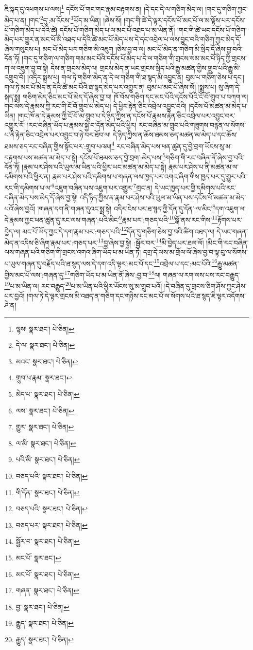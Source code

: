 ཇི་སྐད་དུ་འཕགས་པ་ལས།\footnote{ལྷས།  སྣར་ཐང་།  པེ་ཅིན། } དངོས་པོ་གང་གང་རྣམ་བརྟགས་ན། །དེ་དང་དེ་ལ་གཅིག་མེད་ལ། །གང་དུ་གཅིག་ཀྱང་མེད་པ་ན། །གང་\footnote{དེ་ལ་  སྣར་ཐང་།  པེ་ཅིན། }དུ་:མ་འོངས་\footnote{མའང་  སྣར་ཐང་།  པེ་ཅིན། }ཡོད་མ་ཡིན། །ཞེས་སོ། །གང་གི་ཚེ་དེ་ལྟར་དངོས་པོ་མང་པོ་ལ་མ་ལྟོས་པར་དངོས་པོ་གཅིག་མེད་པ་དེའི་ཚེ། དངོས་པོ་གཅིག་མེད་པ་ལ་མང་པོ་འཐད་པ་མ་ཡིན་ནོ། །གང་གི་ཚེ་ཡང་དངོས་པོ་གཅིག་མེད་པར་གྱུར་ན་མང་པོ་མི་འཐད་པ་དེའི་ཚེ་མང་པོ་མེད་པས་དེ་དང་འབྲེལ་པ་ལས་བྱུང་བའི་གཅིག་ཀྱང་མེད་དོ་ཞེས་གསུངས་པ། མང་པོ་མེད་པར་གཅིག་མི་འཇུག །ཅེས་བྱ་བ་ལ། མང་པོ་མེད་ན་གཅིག་མི་སྲིད་དོ་ཞེས་བྱ་བའི་དོན་ཏོ། །གང་དུ་གཅིག་ལ་གཅིག་གམ་མང་པོའི་དངོས་པོ་མེད་པ་དེ་ལ་གཅིག་གི་གྲངས་སམ་མང་པོ་ཉིད་ཀྱི་གྲངས་ག་ལ་འཇུག་བྱ་བ་སྟེ། དེས་ན་གྲངས་མེད་ལ། གྲངས་མེད་ན་ཡང་གྲངས་སྲིད་པའི་རྒྱུ་མཚན་གྱིས་གྲུབ་པའི་རྒྱུ་མི་འགྲུབ་བོ། །འདིར་སྨྲས་པ། གལ་ཏེ་གཅིག་མེད་ན་དེ་ལ་གཅིག་གི་ཐ་སྙད་མི་འབྱུང་ན། བུམ་པ་གཅིག་ཅེས་པ་དང་། གལ་ཏེ་མང་པོ་མེད་ན་དེའི་ཚེ་མང་པོའི་ཐ་སྙད་མེད་པར་འགྱུར་ན། བུམ་པ་མང་པོ་ཞེས་སོ། །སྨྲས་པ། སུ་ཞིག་དེ་སྐད་སྨྲ། གཅིག་མེད་ཅིང་མང་པོ་མེད་དོ་ཞེས་བྱ་བ། ཁོ་བོས་གཅིག་དང་མང་པོའི་དངོས་པོའི་ངོ་བོ་གྲུབ་པ་བཀག་ལ། གང་ལས་དེ་རྣམས་ཀྱི་རང་གི་ངོ་བོ་གྲུབ་པ་མེད་པ། དེ་ཕྱིར་རྟེན་ཅིང་འབྲེལ་འབྱུང་བའི། །དངོས་པོ་མཚན་མ་མེད་པ་ཡིན། །གང་ཁོ་ན་དེ་རྣམས་ཀྱི་ངོ་བོ་མ་གྲུབ་པ་དེ་ཉིད་ཀྱིས་ན་དངོས་པོ་རྣམས་རྟེན་ཅིང་འབྲེལ་པར་འབྱུང་བར་འགྱུར་རོ། །རང་བཞིན་ཡོད་པ་རྣམས་སྐྱེ་བ་དོན་མེད་པའི་ཕྱིར། རང་བཞིན་མ་གྲུབ་པའི་གཟུགས་བརྙན་ལ་སོགས་པ་ནི་རྟེན་ཅིང་འབྲེལ་པར་འབྱུང་བ་ཉེ་བར་ཐོབ་ལ། དེ་ཉིད་ཀྱིས་ན་ཆོས་ཐམས་ཅད་མཚན་མ་མེད་པ་དང་ཆོས་ཐམས་ཅད་རང་བཞིན་གྱིས་སྟོང་པར་:གྲུབ་པའམ།\footnote{གྲུབ་པ་རྣམ།  སྣར་ཐང་། } རང་བཞིན་མེད་པས་ཕན་ཚུན་དུ་བྱེ་བྲག་ཡོངས་སུ་མ་བརྟགས་པས་མཚན་མ་མེད་པ་སྟེ། དངོས་པོ་ཐམས་ཅད་བྱེ་བྲག་:མེད་པས་\footnote{མེད་པ་  སྣར་ཐང་།  པེ་ཅིན། }གཅིག་གི་རང་བཞིན་ནོ་ཞེས་བྱ་བའི་དོན་ཏོ། །རྣམ་པར་ཤེས་པའི་ཡུལ་མ་ཡིན་པའི་ཕྱིར་ཡང་མཚན་མ་མེད་པ་སྟེ། རྣམ་པར་ཤེས་པ་ནི་མཚན་མ་ལ་དམིགས་པའི་ཕྱིར་ན། རྣམ་པར་ཤེས་པའི་དམིགས་པ་གཞན་ལས་ཁྱད་པར་འགའ་ཞིག་གིས་ཁྱད་པར་དུ་གྱུར་པའི་རང་གི་དམིགས་པ་ལ་\footnote{ལས་  སྣར་ཐང་།  པེ་ཅིན། }འཇུག་བཞིན་པས་འཇུག་པར་འགྱུར་\footnote{གྱུར་  སྣར་ཐང་།  པེ་ཅིན། }གྲང་ན། དེ་ཡང་ཁྱད་པར་གྱི་དམིགས་པའི་རང་བཞིན་མེད་པས་མེད་དོ་ཞེས་བྱ་སྟེ། འདི་ཉིད་ཀྱིས་ན་རྣམ་པར་ཤེས་པའི་ཡུལ་མ་ཡིན་པས་དངོས་པོ་མཚན་མ་མེད་པའོ་ཞེས་བྱའོ། །གཞན་དག་ནི་གཞན་དུའང་སྨྲ་སྟེ། འདིར་ངེས་པར་ཐ་སྙད་ཀྱི་དོན་དུ་དོན་:ལ་མིང་\footnote{ལ་མི་  སྣར་ཐང་།  པེ་ཅིན། }དག་འཇུག་ལ། དེ་རྣམས་ཀྱང་ཕན་ཚུན་དུ་རང་ལས་གཞན་:པའི་མིང་\footnote{པའི་མི་  སྣར་ཐང་།  པེ་ཅིན། }རྣམ་པར་:གཅད་པའི་\footnote{བཅད་པའི་  སྣར་ཐང་།  པེ་ཅིན། }སྒོ་ནས་རང་གིས་\footnote{གི་དོན་  སྣར་ཐང་།  པེ་ཅིན། }རྟོགས་པར་བྱེད་ལ། མང་པོ་ཡོད་ཀྱང་དེ་དག་རྣམ་པར་:གཅད་པའི་\footnote{བཅད་པའི་  སྣར་ཐང་།  པེ་ཅིན། }དོན་དུ་གཅིག་ཅེས་བྱ་བའི་ཚིག་འཐད་ལ། དེ་ཡང་གཞན་མེད་ན་འདིས་ཅི་ཞིག་རྣམ་པར་:གཅད་པར་\footnote{བཅད་པར་  སྣར་ཐང་།  པེ་ཅིན། }བྱ་ཞེས་བྱ་སྟེ། :སྦྱོར་བར་\footnote{སྦྱོར་བ་  སྣར་ཐང་།  པེ་ཅིན། }མི་བྱེད་པར་ཐལ་ལོ། །མིང་གི་རང་བཞིན་ལས་གཞན་པའི་གཅིག་གི་གྲངས་འགའ་ཞིག་ཡོད་པ་མ་ཡིན་ཏེ། དགྲ་དེ་ལས་མ་གྲོལ་ལོ་ཞེས་བྱ་བ་ལྟ་བུ་ལ་སོགས་པ་ཡུལ་གཞན་དུ་བརྗོད་པའི་ཐ་སྙད་ལས་དེ་དག་འདི་ལྟར་:མང་པོ་དང་\footnote{མང་པོ་  སྣར་ཐང་། }འབྲེལ་པ་དང་:མང་པོའི་\footnote{མང་པོ་  སྣར་ཐང་།  པེ་ཅིན། }རྒྱུ་མཚན་གྱིས་མང་པོ་ལས་:གཞན་དུ་\footnote{གཞན་  སྣར་ཐང་།  པེ་ཅིན། }གཅིག་ཡོད་པ་མ་ཡིན་ནོ་ཞེས་:བྱ་བ་\footnote{བྱ་  སྣར་ཐང་།  པེ་ཅིན། }ལ། གཞན་ལ་རག་ལས་པས་རང་བརྒྱུད་\footnote{རྒྱུད་  སྣར་ཐང་།  པེ་ཅིན། }པ་མ་ཡིན་ལ། རང་བརྒྱུད་\footnote{རྒྱུད་  སྣར་ཐང་།  པེ་ཅིན། }པ་མ་ཡིན་པའི་ཕྱིར་ཡོངས་སུ་མ་གྲུབ་པའོ། །དེ་བཞིན་དུ་གྲངས་ཅིག་ཤོས་ཀྱང་ཤེས་པར་བྱའོ། །གལ་ཏེ་དེ་ལྟར་གྲངས་མི་འཐད་ན་གཅིག་དང་གཉིས་དང་མང་པོ་ལ་སོགས་པའི་ཐ་སྙད་ཇི་ལྟར་འདོགས་ཤེ་ན། 